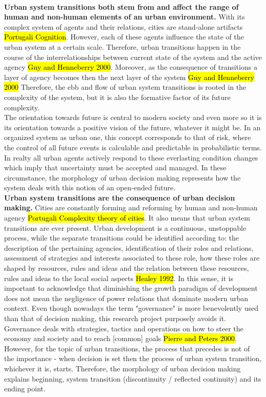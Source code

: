 \documentclass[11pt]{report}
\begin{document}
\\
\textbf{Urban system transitions both stem from and affect the range of human and non-human elements of an urban environment.}
With its complex system of agents and their relations, cities are stand-alone artifacts \hl{Portugali Cognition}.
However, each of these agents influence the state of the urban system at a certain scale. 
Therefore, urban transitions happen in the course of the interrelationships between current state of the system and the active agency \hl{Guy and Henneberry 2000}. Moreover, as the consequence of transitions a layer of agency becomes then the next layer of the system \hl{Guy and Henneberry 2000}
Therefore, the ebb and flow of urban system transitions is rooted in the complexity of the system, but it is also the formative factor of its future complexity.
\\
The orientation towards future is central to modern society and even more so it is its orientation towards a positive vision of the future, whatever it might be. In an organized system as urban one, this concept corresponds to that of risk, where the control of all future events is calculable and predictable in probabilistic terms.
In realty all urban agents actively respond to these everlasting condition changes which imply that uncertainty must be accepted and managed.
In these circumstance, the morphology of urban decision making represents how the system deals with this notion of an open-ended future.   
\\
\textbf{Urban system transitions are the consequence of urban decision making.}
Cities are constantly forming and reforming by human and non-human agency \hl{Portugali Complexity theory of cities}.
It also means that urban system transitions are ever present. Urban development is a continuous, unstoppable process, while the separate transitions could be identified according to: the description of the pertaining agencies, identification of their roles and relations, assessment of strategies and interests associated to these role, how these roles are shaped by resources, rules and ideas and the relation between these resources, rules and ideas to the local social aspects \hl{Healey 1992}.
In this sense, it is important to acknowledge that diminishing the growth paradigm of development does not mean the negligence of power relations that dominate modern urban context. 
Even though nowadays the term "governance" is more benevolently used than that of decision making, this research project purposely avoids it. Governance deals with strategies, tactics and operations on how to steer the economy and society and to reach [common] goals \hl{Pierre and Peters 2000}. However, for the topic of urban transitions, the process that precedes is not of the importance - when decision is set then the process of urban system transition, whichever it is, starts. Therefore, the morphology of urban decision making explains beginning, system transition (discontinuity / reflected continuity) and its ending point.
\end{document}
